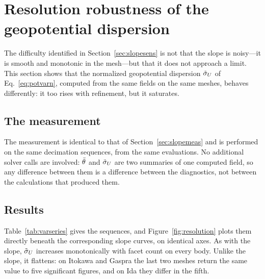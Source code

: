 \section{Resolution robustness of the geopotential dispersion}
\label{sec:varrobust}

The difficulty identified in Section~\ref{sec:slopesens} is not that the slope
is noisy---it is smooth and monotonic in the mesh---but that it does not
approach a limit. This section shows that the normalized geopotential dispersion
$\tilde{\sigma}_{U}$ of Eq.~\eqref{eq:potvarn}, computed from the same fields on the same
meshes, behaves differently: it too rises with refinement, but it saturates.

\subsection{The measurement}
\label{sec:varmeas}

The measurement is identical to that of Section~\ref{sec:slopemeas} and is
performed on the same decimation sequences, from the same evaluations. No
additional solver calls are involved: $\bar{\theta}$ and $\tilde{\sigma}_{U}$ are two
summaries of one computed field, so any difference between them is a difference
between the diagnostics, not between the calculations that produced them.

\subsection{Results}
\label{sec:varres}

Table~\ref{tab:varseries} gives the sequences, and Figure~\ref{fig:resolution}
plots them directly beneath the corresponding slope curves, on identical axes.
As with the slope, $\tilde{\sigma}_{U}$ increases monotonically with facet count on every
body. Unlike the slope, it
flattens: on Itokawa and Gaspra the last two meshes return the same value to
five significant figures, and on Ida they differ in the fifth.

